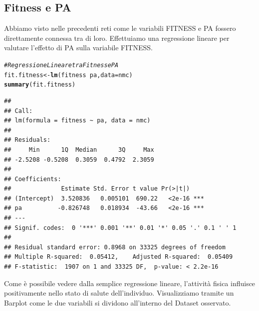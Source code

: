 \documentclass{article}\usepackage[]{graphicx}\usepackage[]{xcolor}
\makeatletter
\newcommand{\hlcom}[1]{\textcolor[rgb]{0.678,0.584,0.686}{\textit{#1}}}%
\newcommand{\hlopt}[1]{\textcolor[rgb]{0,0,0}{#1}}%
\newcommand{\hlstd}[1]{\textcolor[rgb]{0.345,0.345,0.345}{#1}}%
\newcommand{\hlkwb}[1]{\textcolor[rgb]{0.69,0.353,0.396}{#1}}%
\newcommand{\hlkwc}[1]{\textcolor[rgb]{0.333,0.667,0.333}{#1}}%
\newcommand{\hlkwd}[1]{\textcolor[rgb]{0.737,0.353,0.396}{\textbf{#1}}}%
\newenvironment{kframe}{%
 \def\at@end@of@kframe{}%
 \ifinner\ifhmode%
  \def\at@end@of@kframe{\end{minipage}}%
  \begin{minipage}{\columnwidth}%
 \fi\fi%
 \def\FrameCommand##1{\hskip\@totalleftmargin \hskip-\fboxsep
 \colorbox{shadecolor}{##1}\hskip-\fboxsep
     \hskip-\linewidth \hskip-\@totalleftmargin \hskip\columnwidth}%
 \MakeFramed {\advance\hsize-\width
   \@totalleftmargin\z@ \linewidth\hsize
   \@setminipage}}%
 {\par\unskip\endMakeFramed%
 \at@end@of@kframe}
\newenvironment{knitrout}{}{} %
\makeatother
\begin{document}
  \subsection{Fitness e PA}
    Abbiamo visto nelle precedenti reti come le variabili FITNESS e PA fossero 
    direttamente connessa tra di loro. Effettuiamo una regressione lineare per
    valutare l'effetto di PA sulla variabile FITNESS. 
    
\begin{knitrout}
\color{fgcolor}\begin{kframe}
\begin{alltt}
\hlcom{#Regressione Lineare tra Fitness e PA}
\hlstd{fit.fitness} \hlkwb{<-} \hlkwd{lm}\hlstd{(fitness}\hlopt{~}\hlstd{pa,} \hlkwc{data}\hlstd{=nmc)}
\hlkwd{summary}\hlstd{(fit.fitness)}
\end{alltt}
\begin{verbatim}
## 
## Call:
## lm(formula = fitness ~ pa, data = nmc)
## 
## Residuals:
##     Min      1Q  Median      3Q     Max 
## -2.5208 -0.5208  0.3059  0.4792  2.3059 
## 
## Coefficients:
##              Estimate Std. Error t value Pr(>|t|)    
## (Intercept)  3.520836   0.005101  690.22   <2e-16 ***
## pa          -0.826748   0.018934  -43.66   <2e-16 ***
## ---
## Signif. codes:  0 '***' 0.001 '**' 0.01 '*' 0.05 '.' 0.1 ' ' 1
## 
## Residual standard error: 0.8968 on 33325 degrees of freedom
## Multiple R-squared:  0.05412,	Adjusted R-squared:  0.05409 
## F-statistic:  1907 on 1 and 33325 DF,  p-value: < 2.2e-16
\end{verbatim}
\end{kframe}
\end{knitrout}
    
    Come è possibile vedere dalla semplice regressione lineare, l'attività
    fisica influisce positivamente nello stato di salute dell'individuo.
    Visualizziamo tramite un Barplot come le due variabili si dividono
    all'interno del Dataset osservato.
    
\end{document}
